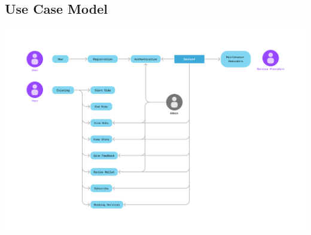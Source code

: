 \documentclass[11pt]{article}
\begin{document}
\subsection{Use Case Model}
\hspace{-1.25cm}\includegraphics*[scale=0.3]{usecase.png}
\end{document}

